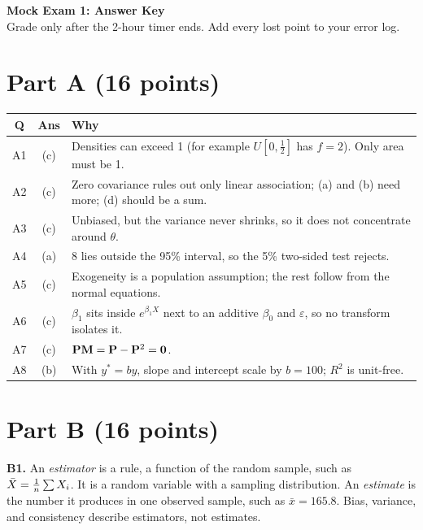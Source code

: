 \documentclass[11pt]{article}
\begin{document}
\begin{center}
{\LARGE\bfseries\color{navy} Mock Exam 1: Answer Key}\\[6pt]
{\color{slate} Grade only after the 2-hour timer ends. Add every lost point to your error log.}
\end{center}

\section{Part A (16 points)}

\begin{center}
\renewcommand{\arraystretch}{1.3}
\begin{tabular}{@{}c c p{11cm}@{}}
\toprule
\textbf{Q} & \textbf{Ans} & \textbf{Why} \\
\midrule
A1 & (c) & Densities can exceed 1 (for example $U[0,\tfrac12]$ has $f=2$). Only area must be 1. \\
A2 & (c) & Zero covariance rules out only linear association; (a) and (b) need more; (d) should be a sum. \\
A3 & (c) & Unbiased, but the variance never shrinks, so it does not concentrate around $\theta$. \\
A4 & (a) & $8$ lies outside the 95\% interval, so the 5\% two-sided test rejects. \\
A5 & (c) & Exogeneity is a population assumption; the rest follow from the normal equations. \\
A6 & (c) & $\beta_1$ sits inside $e^{\beta_1X}$ next to an additive $\beta_0$ and $\varepsilon$, so no transform isolates it. \\
A7 & (c) & $\mathbf{P}\mathbf{M}=\mathbf{P}-\mathbf{P}^2=\mathbf0$. \\
A8 & (b) & With $y^*=by$, slope and intercept scale by $b=100$; $R^2$ is unit-free. \\
\bottomrule
\end{tabular}
\end{center}

\section{Part B (16 points)}

\textbf{B1.} An \emph{estimator} is a rule, a function of the random sample, such as $\bar{X}=\tfrac1n\sum X_i$. It is a random variable with a sampling distribution. An \emph{estimate} is the number it produces in one observed sample, such as $\bar x=165.8$. Bias, variance, and consistency describe estimators, not estimates.
\end{document}
